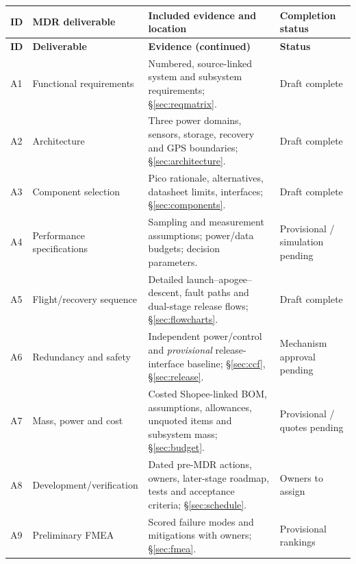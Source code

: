 \small
{}
\begin{longtable}{@{}L{11mm}L{38mm}L{76mm}L{27mm}@{}}
\toprule{}\textbf{ID}&\textbf{MDR deliverable}&\textbf{Included evidence and location}&\textbf{Completion status}\\\midrule\endfirsthead
\toprule{}\textbf{ID}&\textbf{Deliverable}&\textbf{Evidence (continued)}&\textbf{Status}\\\midrule\endhead
\bottomrule\endlastfoot
A1 & Functional requirements & Numbered, source-linked system and subsystem requirements; \S\ref{sec:reqmatrix}. & Draft complete\\
A2 & Architecture & Three power domains, sensors, storage, recovery and GPS boundaries; \S\ref{sec:architecture}. & Draft complete\\
A3 & Component selection & Pico rationale, alternatives, datasheet limits, interfaces; \S\ref{sec:components}. & Draft complete\\
A4 & Performance specifications & Sampling and measurement assumptions; power/data budgets; decision parameters. & Provisional / simulation pending\\
A5 & Flight/recovery sequence & Detailed launch--apogee--descent, fault paths and dual-stage release flows; \S\ref{sec:flowcharts}. & Draft complete\\
A6 & Redundancy and safety & Independent power/control and \emph{provisional} release-interface baseline; \S\ref{sec:ccf}, \S\ref{sec:release}. & Mechanism approval pending\\
A7 & Mass, power and cost & Costed Shopee-linked BOM, assumptions, allowances, unquoted items and subsystem mass; \S\ref{sec:budget}. & Provisional / quotes pending\\
A8 & Development/verification & Dated pre-MDR actions, owners, later-stage roadmap, tests and acceptance criteria; \S\ref{sec:schedule}. & Owners to assign\\
A9 & Preliminary FMEA & Scored failure modes and mitigations with owners; \S\ref{sec:fmea}. & Provisional rankings\\
\end{longtable}
\normalsize

